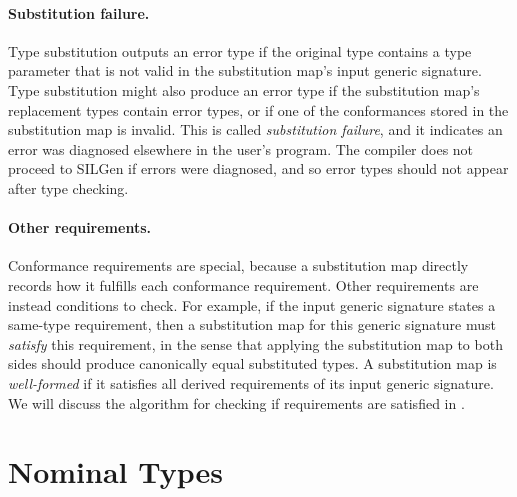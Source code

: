 \documentclass[../generics]{subfiles}
\begin{document}
\paragraph{Substitution failure.}
Type substitution outputs an error type if the original type contains a type parameter that is not valid in the substitution map's input generic signature. Type substitution might also produce an error type if the substitution map's replacement types contain error types, or if one of the conformances stored in the substitution map is invalid. This is called \emph{substitution failure}, and it indicates an error was diagnosed elsewhere in the user's program. The compiler does not proceed to SILGen if errors were diagnosed, and so error types should not appear after type checking.

\paragraph{Other requirements.}
Conformance requirements are special, because a substitution map directly records how it fulfills each conformance requirement. Other requirements are instead conditions to check. For example, if the input generic signature states a same-type requirement, then a substitution map for this generic signature must \emph{satisfy} this requirement, in the sense that applying the substitution map to both sides should produce canonically equal substituted types. A substitution map is \emph{well-formed} if it satisfies all derived requirements of its input generic signature. We will discuss the algorithm for checking if requirements are satisfied in .

\section{Nominal Types}\label{sec:nominal types}
\end{document}
